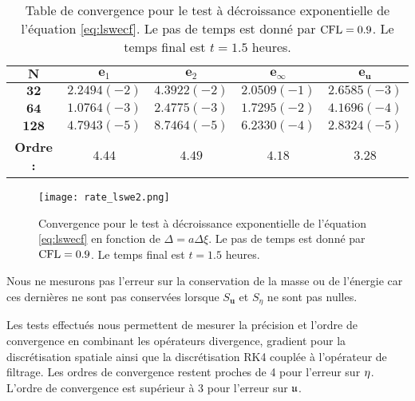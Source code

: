 \begin{table}[htbp]
\begin{center}
\begin{tabular}{|c||c|c|c|c|}
\hline 
$\mathbf{N}$ & $\mathbf{e}_1$ & $\mathbf{e}_2$ & $\mathbf{e}_{\infty}$ & $\mathbf{e}_{\mathbf{u}}$\\ 
\hline 
\hline 
$\mathbf{32}$ & $2.2494(-2)$ & $4.3922(-2)$ & $2.0509(-1)$ & $2.6585(-3)$\\ 

$\mathbf{64}$ & $1.0764(-3)$ & $2.4775(-3)$ & $1.7295(-2)$ & $4.1696(-4)$\\ 

$\mathbf{128}$ & $4.7943(-5)$ & $8.7464(-5)$ & $6.2330(-4)$ & $2.8324(-5)$\\

\hline
\textbf{Ordre :} & $4.44$ & $4.49$ & $4.18$ & $3.28$ \\ 
\hline
\end{tabular} 
\end{center}
\caption{Table de convergence pour le test à décroissance exponentielle de l'équation \eqref{eq:lswecf}. Le pas de temps est donné par $\text{CFL}=0.9$. Le temps final est $t=1.5$ heures.}
\label{tab:rate_lswe2}
\end{table}


\begin{figure}[htbp]
\begin{center}
\texttt{[image: rate\_lswe2.png]}
\end{center}
\caption{Convergence pour le test à décroissance exponentielle de l'équation \eqref{eq:lswecf} en fonction de $\Delta = a \Delta \xi$. Le pas de temps est donné par $\text{CFL}=0.9$. Le temps final est $t=1.5$ heures.}
\label{fig:rate_lswe2}
\end{figure}

Nous ne mesurons pas l'erreur sur la conservation de la masse ou de l'énergie car ces dernières ne sont pas conservées lorsque $S_{\mathbf{u}}$ et $S_{\eta}$ ne sont pas nulles.

Les tests effectués nous permettent de mesurer la précision et l'ordre de convergence en combinant les opérateurs divergence, gradient pour la discrétisation spatiale ainsi que la discrétisation RK4 couplée à l'opérateur de filtrage. Les ordres de convergence restent proches de 4 pour l'erreur sur $\mathbf{\eta}$. L'ordre de convergence est supérieur à 3 pour l'erreur sur $\mathfrak{u}$.



























